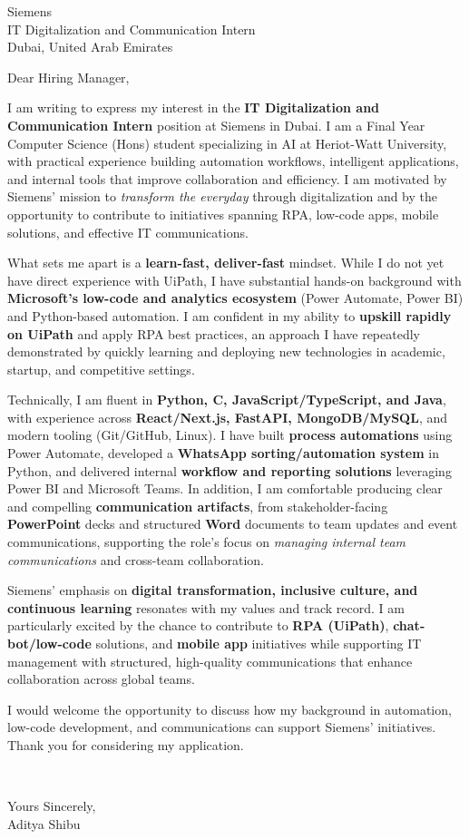 \documentclass{letter}
\begin{document}
\begin{letter}{Siemens \\ IT Digitalization and Communication Intern \\ Dubai, United Arab Emirates}
\opening{Dear Hiring Manager,}

I am writing to express my interest in the \textbf{IT Digitalization and Communication Intern} position at Siemens in Dubai. I am a Final Year Computer Science (Hons) student specializing in AI at Heriot-Watt University, with practical experience building automation workflows, intelligent applications, and internal tools that improve collaboration and efficiency. I am motivated by Siemens’ mission to \emph{transform the everyday} through digitalization and by the opportunity to contribute to initiatives spanning RPA, low-code apps, mobile solutions, and effective IT communications.

What sets me apart is a \textbf{learn-fast, deliver-fast} mindset. While I do not yet have direct experience with UiPath, I have substantial hands-on background with \textbf{Microsoft’s low-code and analytics ecosystem} (Power Automate, Power BI) and Python-based automation. I am confident in my ability to \textbf{upskill rapidly on UiPath} and apply RPA best practices, an approach I have repeatedly demonstrated by quickly learning and deploying new technologies in academic, startup, and competitive settings.

Technically, I am fluent in \textbf{Python, C, JavaScript/TypeScript, and Java}, with experience across \textbf{React/Next.js, FastAPI, MongoDB/MySQL}, and modern tooling (Git/GitHub, Linux). I have built \textbf{process automations} using Power Automate, developed a \textbf{WhatsApp sorting/automation system} in Python, and delivered internal \textbf{workflow and reporting solutions} leveraging Power BI and Microsoft Teams. In addition, I am comfortable producing clear and compelling \textbf{communication artifacts}, from stakeholder-facing \textbf{PowerPoint} decks and structured \textbf{Word} documents to team updates and event communications, supporting the role’s focus on \emph{managing internal team communications} and cross-team collaboration.

Siemens’ emphasis on \textbf{digital transformation, inclusive culture, and continuous learning} resonates with my values and track record. I am particularly excited by the chance to contribute to \textbf{RPA (UiPath)}, \textbf{chat-bot/low-code} solutions, and \textbf{mobile app} initiatives while supporting IT management with structured, high-quality communications that enhance collaboration across global teams.

I would welcome the opportunity to discuss how my background in automation, low-code development, and communications can support Siemens’ initiatives. Thank you for considering my application.

\closing{~}

Yours Sincerely,\\[2mm]
Aditya Shibu

\end{letter}
\end{document}
